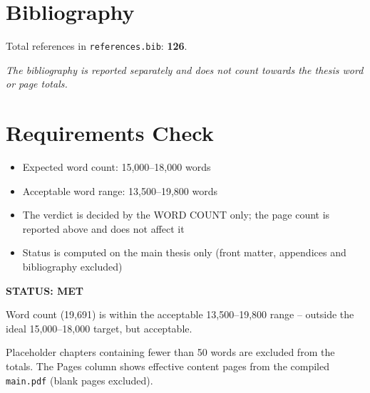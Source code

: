 \documentclass[11pt,a4paper]{article}
\begin{document}
\section*{Bibliography}

\noindent
Total references in \texttt{references.bib}: \textbf{126}.

\vspace{0.2cm}

\noindent
\textit{The bibliography is reported separately and does not count towards the thesis word or page totals.}

\vspace{0.5cm}

\section*{Requirements Check}

\begin{itemize}
\item Expected word count: 15,000--18,000 words
\item Acceptable word range: 13,500--19,800 words
\item The verdict is decided by the WORD COUNT only; the page count is reported above and does not affect it
\item Status is computed on the main thesis only (front matter, appendices and bibliography excluded)
\end{itemize}

\vspace{0.5cm}

\noindent
\textbf{STATUS: MET}

\vspace{0.2cm}

\noindent
Word count (19,691) is within the acceptable 13,500--19,800 range -- outside the ideal 15,000--18,000 target, but acceptable.

\vspace{0.3cm}

\noindent
Placeholder chapters containing fewer than 50 words are excluded from the totals. The Pages column shows effective content pages from the compiled \texttt{main.pdf} (blank pages excluded).
\end{document}
